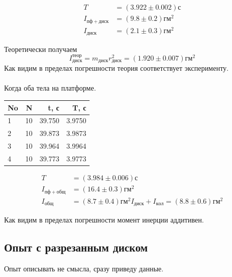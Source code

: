 \documentclass[a4paper, 12pt]{article}
\begin{document}
    \begin{align*}
    T &= (3.922 \pm 0.002)с \\
    I_{пф+диск}&=(9.8 \pm 0.2)гм^2 \\
    I_{диск}&=(2.1 \pm 0.3)гм^2
    \end{align*}

    Теоретически получаем
    \[I^{теор}_{диск} = m_{диск}r_{диск}^2 = (1.920 \pm 0.007)гм^2\]
    Как видим в пределах погрешности теория соответствует эксперименту.

    \paragraph{}
    Когда оба тела на платформе.

    \begin{table}[h!]
    \begin{center}
    \begin{tabular}{|l|r|r|r|}
    \hline
    No &   N &       t, с &         T, с \\
    \hline
    1  &  10 &  39.750 &  3.9750 \\
    2  &  10 &  39.873 &  3.9873 \\
    3  &  10 &  39.964 &  3.9964 \\
    4  &  10 &  39.773 &  3.9773 \\
    \hline
    \end{tabular}
    \end{center}
    \end{table}

    \begin{align*}
    T &= (3.984 \pm 0.006)с \\
    I_{пф+общ}&=(16.4 \pm 0.3)гм^2 \\
    I_{общ}&=(8.7 \pm 0.4)гм^2
    I_{диск} + I_{кол}  = (8.8 \pm 0.6)гм^2
    \end{align*}

    Как видим в пределах погрешности момент инерции аддитивен.

    \subsection{Опыт с разрезанным диском}

    Опыт описывать не смысла, сразу приведу данные.
\end{document}

